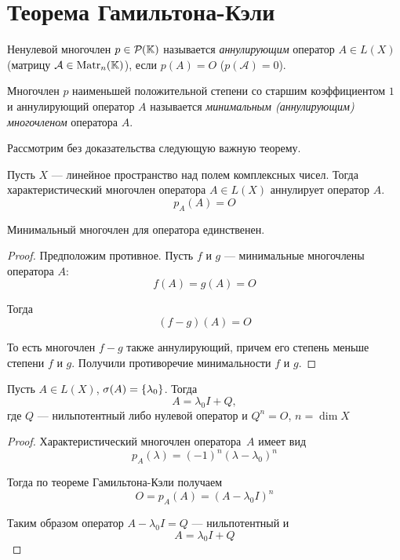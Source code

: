 \section{Теорема Гамильтона-Кэли}
\begin{definition}
    Ненулевой многочлен $p \in \mathcal{P}_{}({\mathbb{K}})$ называется \emph{аннулирующим} оператор $A
    \in L(X)$ (матрицу $\mathcal{A} \in \mathrm{Matr}_{n}({\mathbb{K}})$), если $p(A) = O$
    ($p(\mathcal{A}) = 0$).
\end{definition}

\begin{definition}
    Многочлен $p$ наименьшей положительной степени со старшим коэффициентом $1$
    и аннулирующий оператор $A$ называется \emph{минимальным (аннулирующим) многочленом}
    оператора $A$.
\end{definition}

Рассмотрим без доказательства следующую важную теорему.

\begin{theorem} \label{th:hamiltoncayley}
    Пусть $X$ — линейное пространство над полем комплексных чисел.
    Тогда характеристический многочлен оператора $A \in L(X)$ аннулирует оператор
    $A$.
    \[ p_A(A) = O \]
\end{theorem}

\begin{lemma}
    Минимальный многочлен для оператора единственен.    
\end{lemma}

\begin{proof}
    Предположим противное. Пусть $f$ и $g$ — минимальные многочлены оператора $A$:
    \[ f(A) = g(A) = O \]

    Тогда
    \[ (f - g)(A) = O \]

    То есть многочлен $f - g$ также аннулирующий, причем его степень меньше
    степени $f$ и $g$. Получили противоречие минимальности $f$ и $g$.
\end{proof}

\begin{corollaryth}
    Пусть $A\in L(X)$, $\operatorname{\sigma}(A) = \left\{\lambda_0\right\}$. Тогда
    \[ A = \lambda_0 I + Q, \]
    где $Q$ — нильпотентный либо нулевой оператор и $Q^n = O$, $n = \dim X$
\end{corollaryth}

\begin{proof}
    Характеристический многочлен оператора~$A$ имеет вид
    \[ p_A(\lambda) = (-1)^n (\lambda-\lambda_0)^n \]

    Тогда по теореме Гамильтона-Кэли получаем
    \[ O = p_A(A) = (A-\lambda_0 I)^n \]

    Таким образом оператор $A-\lambda_0 I = Q$ — нильпотентный и 
    \[ A = \lambda_0 I + Q \]
\end{proof}
